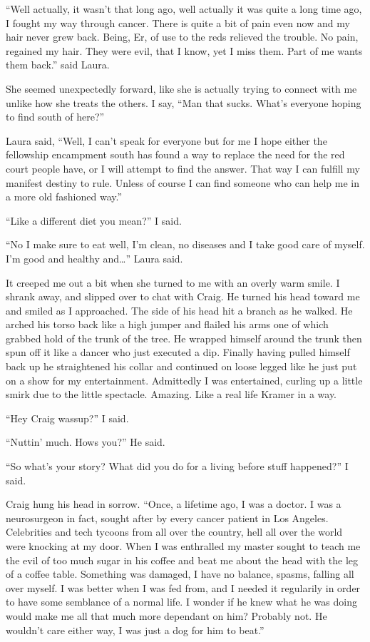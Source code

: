 ``Well actually, it wasn't that long ago, well actually it was quite a long time ago, I fought my way through cancer. There is quite a bit of pain even now and my hair never grew back. Being, Er, of use to the reds relieved the trouble. No pain, regained my hair. They were evil, that I know, yet I miss them. Part of me wants them back.'' said Laura.

She seemed unexpectedly forward, like she is actually trying to connect with me unlike how she treats the others. I say, ``Man that sucks. What's everyone hoping to find south of here?''

Laura said, ``Well, I can't speak for everyone but for me I hope either the fellowship encampment south has found a way to replace the need for the red court people have, or I will attempt to find the answer. That way I can fulfill my manifest destiny to rule. Unless of course I can find someone who can help me in a more old fashioned way.''

``Like a different diet you mean?'' I said.

``No I make sure to eat well, I'm clean, no diseases and I take good care of myself. I'm good and healthy and\dots'' Laura said.

It creeped me out a bit when she turned to me with an overly warm smile. I shrank away, and slipped over to chat with Craig. He turned his head toward me and smiled as I approached. The side of his head hit a branch as he walked. He arched his torso back like a high jumper and flailed his arms one of which grabbed hold of the trunk of the tree. He wrapped himself around the trunk then spun off it like a dancer who just executed a dip. Finally having pulled himself back up he straightened his collar and continued on loose legged like he just put on a show for my entertainment. Admittedly I was entertained, curling up a little smirk due to the little spectacle. Amazing. Like a real life Kramer in a way.

``Hey Craig wassup?'' I said.

``Nuttin' much. Hows you?'' He said.

``So what's your story? What did you do for a living before stuff happened?'' I said.

Craig hung his head in sorrow. ``Once, a lifetime ago, I was a doctor. I was a neurosurgeon in fact, sought after by every cancer patient in Los Angeles. Celebrities and tech tycoons from all over the country, hell all over the world were knocking at my door. When I was enthralled my master sought to teach me the evil of too much sugar in his coffee and beat me about the head with the leg of a coffee table. Something was damaged, I have no balance, spasms, falling all over myself. I was better when I was fed from, and I needed it regularily in order to have some semblance of a normal life. I wonder if he knew what he was doing would make me all that much more dependant on him? Probably not. He wouldn't care either way, I was just a dog for him to beat.''

